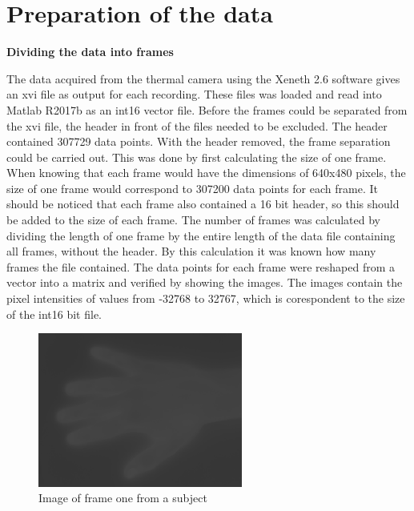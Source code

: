 \chapter{Preparation of the data}

\textbf{Dividing the data into frames}

The data acquired from the thermal camera using the Xeneth 2.6 software gives an xvi file as output for each recording. These files was loaded and read into Matlab R2017b as an int16 vector file. Before the frames could be separated from the xvi file, the header in front of the files needed to be excluded. The header contained 307729 data points. With the header removed, the frame separation could be carried out. This was done by first calculating the size of one frame. When knowing that each frame would have the dimensions of 640x480 pixels, the size of one frame would correspond to 307200 data points for each frame. It should be noticed that each frame also contained a 16 bit header, so this should be added to the size of each frame. The number of frames was calculated by dividing the length of one frame by the entire length of the data file containing all frames, without the header. By this calculation it was known how many frames the file contained. The data points for each frame were reshaped from a vector into a matrix and verified by showing the images. 
The images contain the pixel intensities of values from -32768 to 32767, which is corespondent to the size of the int16 bit file. 


\begin{figure}[H]
	\includegraphics[width=0.6\textwidth]{figures/uint16Hand}  %
	\caption{Image of frame one from a subject}
	\label{fig:hand}  %
\end{figure}